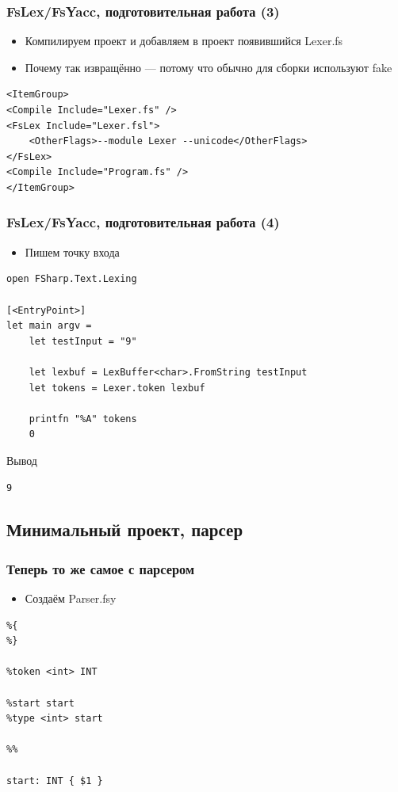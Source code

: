 \documentclass{../../slides-style}
\begin{document}
    \begin{frame}[fragile]
        \frametitle{FsLex/FsYacc, подготовительная работа (3)}
        \begin{itemize}
            \item Компилируем проект и добавляем в проект появившийся Lexer.fs
            \item Почему так извращённо --- потому что обычно для сборки используют fake
        \end{itemize}
        \begin{scriptsize}
            \begin{verbatim}
<ItemGroup>
<Compile Include="Lexer.fs" />
<FsLex Include="Lexer.fsl">
    <OtherFlags>--module Lexer --unicode</OtherFlags>
</FsLex>
<Compile Include="Program.fs" />
</ItemGroup>
            \end{verbatim}
        \end{scriptsize}
    \end{frame}

    \begin{frame}[fragile]
        \frametitle{FsLex/FsYacc, подготовительная работа (4)}
        \begin{itemize}
            \item Пишем точку входа
        \end{itemize}
        \begin{verbatim}
open FSharp.Text.Lexing

[<EntryPoint>]
let main argv =
    let testInput = "9"

    let lexbuf = LexBuffer<char>.FromString testInput
    let tokens = Lexer.token lexbuf

    printfn "%A" tokens
    0 
        \end{verbatim}

        \begin{exampleblock}{Вывод}
            \begin{verbatim}
9
            \end{verbatim}
        \end{exampleblock}
    \end{frame}

    \subsection{Минимальный проект, парсер}

    \begin{frame}[fragile]
        \frametitle{Теперь то же самое с парсером}
        \begin{itemize}
            \item Создаём Parser.fsy
        \end{itemize}
        \begin{verbatim}
%{
%}

%token <int> INT

%start start
%type <int> start

%%

start: INT { $1 }
        \end{verbatim}
    \end{frame}
\end{document}
